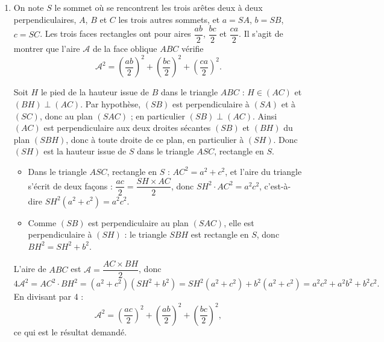 \begin{enumerate}
\item On note $S$ le sommet où se rencontrent les trois arêtes deux à deux perpendiculaires, $A$, $B$ et $C$ les trois autres sommets, et $a = SA$, $b = SB$, $c = SC$. Les trois faces rectangles ont pour aires $\dfrac{ab}{2}$, $\dfrac{bc}{2}$ et $\dfrac{ca}{2}$. Il s'agit de montrer que l'aire $\mathcal{A}$ de la face oblique $ABC$ vérifie
\[\mathcal{A}^2 = \left(\frac{ab}{2}\right)^2 + \left(\frac{bc}{2}\right)^2 + \left(\frac{ca}{2}\right)^2.\]

Soit $H$ le pied de la hauteur issue de $B$ dans le triangle $ABC$ : $H \in (AC)$ et $(BH) \perp (AC)$. Par hypothèse, $(SB)$ est perpendiculaire à $(SA)$ et à $(SC)$, donc au plan $(SAC)$ ; en particulier $(SB) \perp (AC)$. Ainsi $(AC)$ est perpendiculaire aux deux droites sécantes $(SB)$ et $(BH)$ du plan $(SBH)$, donc à toute droite de ce plan, en particulier à $(SH)$. Donc $(SH)$ est la hauteur issue de $S$ dans le triangle $ASC$, rectangle en $S$.

\begin{itemize}
    \item Dans le triangle $ASC$, rectangle en $S$ : $AC^2 = a^2 + c^2$, et l'aire du triangle s'écrit de deux façons : $\dfrac{ac}{2} = \dfrac{SH \times AC}{2}$, donc $SH^2 \cdot AC^2 = a^2c^2$, c'est-à-dire $SH^2 (a^2 + c^2) = a^2c^2$.
    \item Comme $(SB)$ est perpendiculaire au plan $(SAC)$, elle est perpendiculaire à $(SH)$ : le triangle $SBH$ est rectangle en $S$, donc $BH^2 = SH^2 + b^2$.
\end{itemize}

L'aire de $ABC$ est $\mathcal{A} = \dfrac{AC \times BH}{2}$, donc
\[4\mathcal{A}^2 = AC^2 \cdot BH^2 = (a^2 + c^2)(SH^2 + b^2) = SH^2 (a^2 + c^2) + b^2 (a^2 + c^2) = a^2c^2 + a^2b^2 + b^2c^2.\]
En divisant par 4 :
\[\mathcal{A}^2 = \left(\frac{ac}{2}\right)^2 + \left(\frac{ab}{2}\right)^2 + \left(\frac{bc}{2}\right)^2,\]
ce qui est le résultat demandé.
\end{enumerate}
